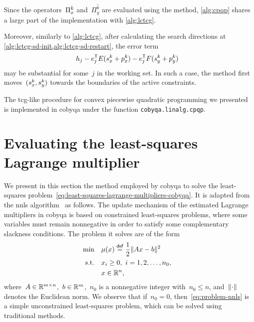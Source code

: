 Since the operators~$\Pi_{\iter}^{\hat{k}}$ and~$\Pi_y^{\hat{k}}$ are evaluated using the \citeauthor{Goldfarb_Idnani_1983} method, \cref{alg:cpqp} shares a large part of the implementation with \cref{alg:lctcg}.

Moreover, similarly to \cref{alg:lctcg}, after calculating the search directions at \cref{alg:lctcg-sd-init,alg:lctcg-sd-restart}, the error term
\begin{equation*}
    h_j - e_j^{\T} E (\sstep[k]_{\iter} + \pstep[k]_{\iter}) - e_j^{\T} F (\sstep[k]_y + \pstep[k]_y)
\end{equation*}
may be substantial for some~$j$ in the working set.
In such a case, the method first moves~$(\sstep[k]_{\iter}, \sstep[k]_y)$ towards the boundaries of the active constraints.

The \gls{tcg}-like procedure for convex piecewise quadratic programming we presented is implemented in \gls{cobyqa} under the function \texttt{cobyqa.linalg.cpqp}.

\section{Evaluating the least-squares Lagrange multiplier}
\label{sec:cobyqa-lagrange-multipliers}

We present in this section the method employed by \gls{cobyqa} to solve the least-squares problem~\cref{eq:least-squares-lagrange-multipliers-cobyqa}.
It is adapted from the \gls{nnls} algorithm~\cite[Alg.~(23.10)]{Lawson_Hanson_1987} as follows.
The update mechanism of the estimated Lagrange multipliers in \gls{cobyqa} is based on constrained least-squares problems, where some variables must remain nonnegative in order to satisfy some complementary slackness conditions.
The problem it solves are of the form
\begin{subequations}
    \label{eq:problem-nnls}
    \begin{align}
        \min        & \quad \mu(\iter) \eqdef \frac{1}{2} \norm{A \iter - b}^2\\
        \text{s.t.} & \quad \iter_i \ge 0, ~ i = 1, 2, \dots, n_0,\\
                    & \quad \iter \in \R^n,
    \end{align}
\end{subequations}
where~$A \in \mathbb{R}^{m \times n}$,~$b \in \mathbb{R}^m$,~$n_0$ is a nonnegative integer with~$n_0 \le n$, and~$\lVert\cdot\rVert$ denotes the Euclidean norm.
We observe that if~$n_0 = 0$, then~\cref{eq:problem-nnls} is a simple unconstrained least-squares problem, which can be solved using traditional methods.

